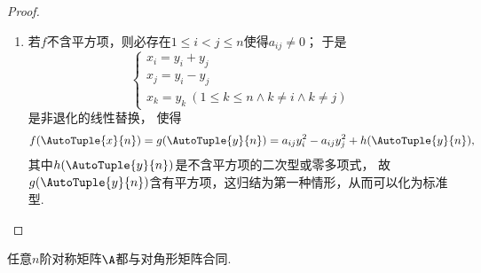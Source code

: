 \begin{theorem}
\begin{proof}
\begin{enumerate}
\item 若\(f\)不含平方项，则必存在\(1 \leq i < j \leq n\)使得\(a_{ij}\neq0\)；
于是\[
	\left\{ \begin{array}{l}
		x_i = y_i + y_j \\
		x_j = y_i - y_j \\
		x_k = y_k\ (1 \leq k \leq n \land k \neq i \land k \neq j)
	\end{array} \right.
\]是非退化的线性替换，
使得\[
	f(\AutoTuple{x}{n})
	= g(\AutoTuple{y}{n})
	= a_{ij} y_i^2 - a_{ij} y_j^2 + h(\AutoTuple{y}{n}),
\]
其中\(h(\AutoTuple{y}{n})\)是不含平方项的二次型或零多项式，
故\(g(\AutoTuple{y}{n})\)含有平方项，这归结为第一种情形，从而可以化为标准型.
\qedhere
\end{enumerate}
\end{proof}
\end{theorem}

\begin{corollary}
任意\(n\)阶对称矩阵\(\A\)都与对角形矩阵合同.
\end{corollary}

